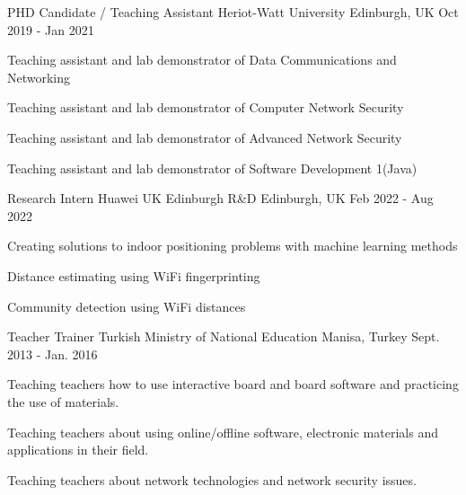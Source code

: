 




\begin{cventries}
  \cventry
    {PHD Candidate / Teaching Assistant} %
    {Heriot-Watt University} %
    {Edinburgh, UK} %
    {Oct 2019 - Jan 2021} %
    {
      \begin{cvitems} %
        \item {Teaching assistant and lab demonstrator of Data Communications and Networking}
		\item {Teaching assistant and lab demonstrator of Computer Network Security}
		 \item {Teaching assistant and lab demonstrator of Advanced Network Security}
		\item {Teaching assistant and lab demonstrator of Software Development 1(Java)}
      \end{cvitems}
    }


  \cventry
    {Research Intern} %
    {Huawei UK Edinburgh R\&D} %
    {Edinburgh, UK} %
    {Feb 2022  - Aug 2022 } %
    {
      \begin{cvitems} %
        \item {Creating solutions to indoor positioning problems with machine learning methods}
		\item {Distance estimating using WiFi fingerprinting}
		 \item {Community detection using WiFi distances}
      \end{cvitems}
    }
  \cventry
    {Teacher Trainer} %
    {Turkish Ministry of National Education} %
    {Manisa, Turkey} %
    {Sept. 2013 - Jan. 2016} %
    {
      \begin{cvitems} %
               \item {Teaching teachers how to use interactive board and board software and practicing the use of materials.}
\item {Teaching teachers about using online/offline software, electronic materials and applications in their field.}
\item {Teaching teachers about network technologies and network security issues.}
      \end{cvitems}
    }






\end{cventries}
